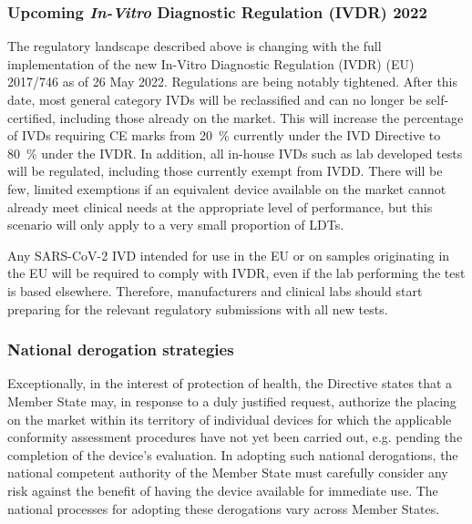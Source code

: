         \subsubsection{Upcoming \emph{In-Vitro} Diagnostic Regulation (IVDR) 2022}

            The regulatory landscape described above is changing with the full implementation of the new In-Vitro Diagnostic Regulation (IVDR) (EU) 2017/746 as of 26 May 2022.\cite{EU2017} Regulations are being notably tightened. After this date, most general category IVDs will be reclassified and can no longer be self-certified, including those already on the market. This will increase the percentage of IVDs requiring CE marks from \qty{20}{\percent} currently under the IVD Directive to \qty{80}{\percent} under the IVDR.\cite{Vollebregt2016} In addition, all in-house IVDs such as lab developed tests will be regulated, including those currently exempt from IVDD. There will be few, limited exemptions if an equivalent device available on the market cannot already meet clinical needs at the appropriate level of performance, but this scenario will only apply to a very small proportion of LDTs.

            Any SARS-CoV-2 IVD intended for use in the EU or on samples originating in the EU will be required to comply with IVDR, even if the lab performing the test is based elsewhere. Therefore, manufacturers and clinical labs should start preparing for the relevant regulatory submissions with all new tests.

        \subsubsection{National derogation strategies}

            Exceptionally, in the interest of protection of health, the Directive states that a Member State may, in response to a duly justified request, authorize the placing on the market within its territory of individual devices for which the applicable conformity assessment procedures have not yet been carried out, e.g. pending the completion of the device’s evaluation. In adopting such national derogations, the national competent authority of the Member State must carefully consider any risk against the benefit of having the device available for immediate use. The national processes for adopting these derogations vary across Member States.\cite{EC2020}